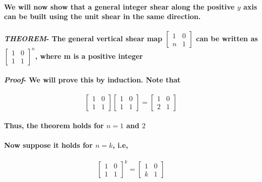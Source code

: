 \documentclass{report}
\begin{document}
\paragraph{We will now show that a general integer shear along the positive $y$ axis can be built using the unit shear in the same direction.}

\paragraph{\textit{THEOREM}- The general vertical shear map
$\begin{bmatrix}
1&0\\n&1
\end{bmatrix}$
can be written as
$\begin{bmatrix}
1&0\\1&1
\end{bmatrix}^n$,
where m is a positive integer
}

\paragraph{\textit{Proof}- We will prove this by induction. Note that}

\begin{equation}
\begin{bmatrix}
1&0\\1&1
\end{bmatrix}
\begin{bmatrix}
1&0\\1&1
\end{bmatrix}=
\begin{bmatrix}
1&0\\2&1
\end{bmatrix}
\end{equation}

\paragraph{Thus, the theorem holds for $n=1$ and $2$}

\paragraph{Now suppose it holds for $n=k$, i.e,}

\begin{equation}
\begin{bmatrix}
1&0\\1&1
\end{bmatrix}^k
=
\begin{bmatrix}
1&0\\k&1
\end{bmatrix}
\end{equation}
\end{document}
